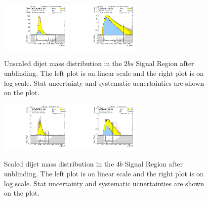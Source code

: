 \begin{figure}[htbp!]
\begin{center}
\includegraphics[width=0.31\textwidth,angle=-90]{figures/boosted/Signal_Syst/Moriond_bkg_9_TwoTag_split_Signal_mHH_l.pdf}
\includegraphics[width=0.31\textwidth,angle=-90]{figures/boosted/Signal_Syst/Moriond_bkg_9_TwoTag_split_Signal_mHH_l_1.pdf}  
  \caption{Unscaled dijet mass distribution in the $2bs$ Signal Region after unblinding. The left plot is on linear scale and the right plot is on log scale. Stat uncertainty and systematic ucnertainties are shown on the plot.}
  \label{fig:boosted-2b-signal-l}
\end{center}
\end{figure}

\begin{figure}[htbp!]
\begin{center}
\includegraphics[width=0.31\textwidth,angle=-90]{figures/boosted/Signal_Syst/Moriond_bkg_9_FourTag_Signal_mHH_pole.pdf}
\includegraphics[width=0.31\textwidth,angle=-90]{figures/boosted/Signal_Syst/Moriond_bkg_9_FourTag_Signal_mHH_pole_1.pdf}
  \caption{Scaled dijet mass distribution in the $4b$ Signal Region after unblinding. The left plot is on linear scale and the right plot is on log scale. Stat uncertainty and systematic ucnertainties are shown on the plot.}
  \label{fig:boosted-4b-signal-pole}
\end{center}
\end{figure}

